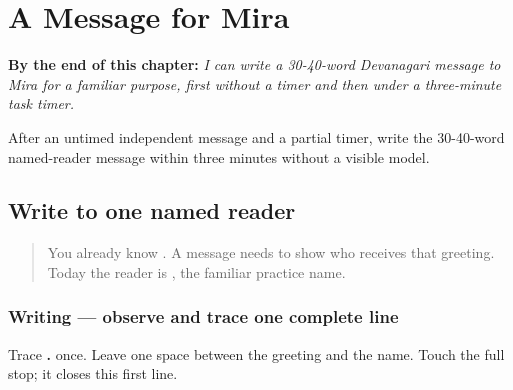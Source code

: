 
\chapter{A Message for Mira}
\label{ch:mr-a1-named-reader-message}

\begin{chapteropening}
\textbf{By the end of this chapter:} \emph{I can write a 30-40-word Devanagari message to Mira for a familiar purpose, first without a timer and then under a three-minute task timer.}

After an untimed independent message and a partial timer, write the 30-40-word named-reader message within three minutes without a visible model.
\end{chapteropening}

\section[\texorpdfstring{\mr{नमस्कार} \mr{मीरा}. (namaskār Mīrā)}{नमस्कार मीरा. (namaskār Mīrā)}]{Write to one named reader}

\label{lesson:MR-A1M01-reader-greeting}



\begin{quote}
You already know \textbf{}. A message needs to show who receives that greeting. Today the reader is \textbf{}, the familiar practice name.
\end{quote}

\subsection*{Writing — observe and trace one complete line}
Trace \textbf{ .} once. Leave one space between the greeting and the name. Touch the full stop; it closes this first line.

